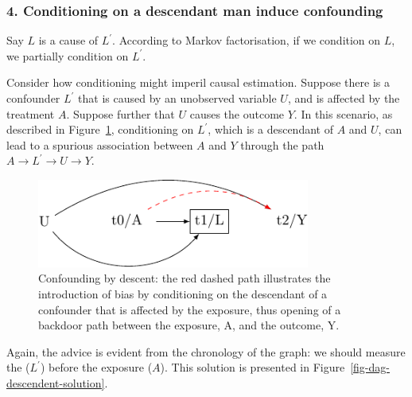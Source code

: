 \documentclass[
  singlecolumn]{article}
\begin{document}
\hypertarget{conditioning-on-a-descendant-man-induce-confounding}{%
\subsubsection{4. Conditioning on a descendant man induce
confounding}\label{conditioning-on-a-descendant-man-induce-confounding}}

Say \(L\) is a cause of \(L^\prime\). According to Markov factorisation,
if we condition on \(L\), we partially condition on \(L^\prime\).

Consider how conditioning might imperil causal estimation. Suppose there
is a confounder \(L^\prime\) that is caused by an unobserved variable
\(U\), and is affected by the treatment \(A\). Suppose further that
\(U\) causes the outcome \(Y\). In this scenario, as described in
Figure~\ref{fig-dag-descendent}, conditioning on \(L^\prime\), which is
a descendant of \(A\) and \(U\), can lead to a spurious association
between \(A\) and \(Y\) through the path \(A \to L^\prime \to U \to Y\).

\begin{figure}

{\centering \includegraphics[width=0.8\textwidth,height=\textheight]{causal-dags_files/figure-pdf/fig-dag-descendent-1.pdf}

}

\caption{\label{fig-dag-descendent}Confounding by descent: the red
dashed path illustrates the introduction of bias by conditioning on the
descendant of a confounder that is affected by the exposure, thus
opening of a backdoor path between the exposure, A, and the outcome, Y.}

\end{figure}

Again, the advice is evident from the chronology of the graph: we should
measure the (\(L^\prime\)) before the exposure (\(A\)). This solution is
presented in Figure~\ref{fig-dag-descendent-solution}.
\end{document}
